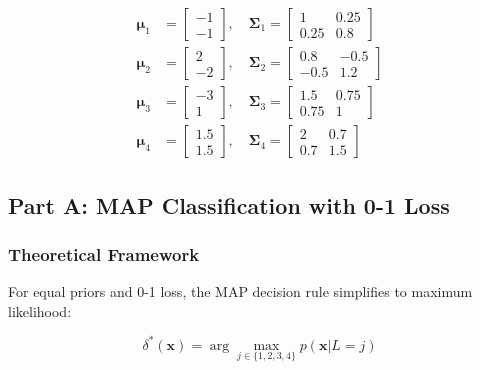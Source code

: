 \documentclass[12pt]{article}
\begin{document}
\begin{align*}
\boldsymbol{\mu}_1 &= \begin{bmatrix} -1 \\ -1 \end{bmatrix}, \quad
\boldsymbol{\Sigma}_1 = \begin{bmatrix} 1 & 0.25 \\ 0.25 & 0.8 \end{bmatrix} \\
\boldsymbol{\mu}_2 &= \begin{bmatrix} 2 \\ -2 \end{bmatrix}, \quad
\boldsymbol{\Sigma}_2 = \begin{bmatrix} 0.8 & -0.5 \\ -0.5 & 1.2 \end{bmatrix} \\
\boldsymbol{\mu}_3 &= \begin{bmatrix} -3 \\ 1 \end{bmatrix}, \quad
\boldsymbol{\Sigma}_3 = \begin{bmatrix} 1.5 & 0.75 \\ 0.75 & 1 \end{bmatrix} \\
\boldsymbol{\mu}_4 &= \begin{bmatrix} 1.5 \\ 1.5 \end{bmatrix}, \quad
\boldsymbol{\Sigma}_4 = \begin{bmatrix} 2 & 0.7 \\ 0.7 & 1.5 \end{bmatrix}
\end{align*}

\subsection{Part A: MAP Classification with 0-1 Loss}

\subsubsection{Theoretical Framework}
For equal priors and 0-1 loss, the MAP decision rule simplifies to maximum likelihood:

\begin{equation}
\delta^*(\mathbf{x}) = \arg\max_{j \in \{1,2,3,4\}} p(\mathbf{x}|L=j)
\end{equation}
\end{document}
